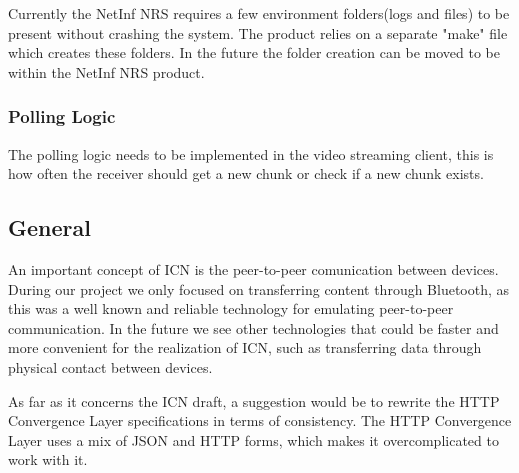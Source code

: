 Currently the NetInf NRS requires a few environment folders(logs and files) to be present without crashing the system. The product relies on a separate "make" file which creates these folders. In the future the folder creation can be moved to be within the NetInf NRS product.

\subsubsection{Polling Logic}

The polling logic needs to be implemented in the video streaming client, this is how often the receiver should get a new chunk or check if a new chunk exists.  

\subsection{General}

An important concept of ICN is the peer-to-peer comunication between devices. 
During our project we only focused on transferring content
through Bluetooth, as this was a well known and reliable technology for emulating peer-to-peer communication.
In the future we see other technologies that could be faster and more convenient for the realization of ICN,
such as transferring data through physical contact between devices.

As far as it concerns the ICN draft, a suggestion would be to rewrite the HTTP Convergence Layer specifications
in terms of consistency. The HTTP Convergence Layer uses a mix of JSON and HTTP forms, which makes it
overcomplicated to work with it. 



